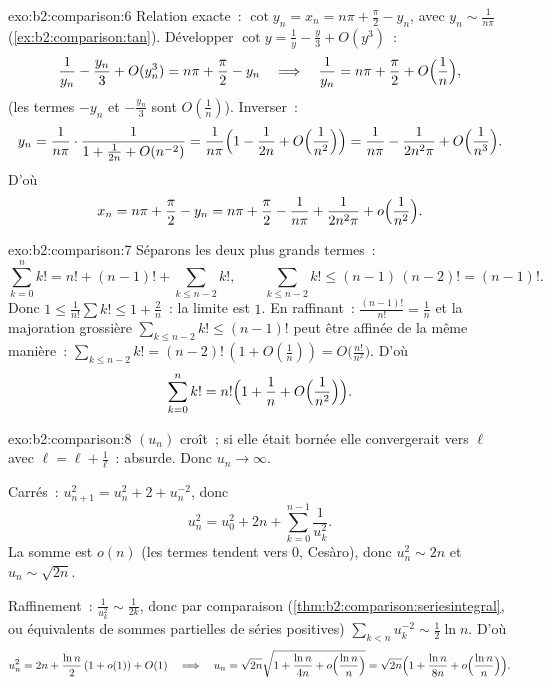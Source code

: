 \begin{solution}{exo:b2:comparison:6}
Relation exacte~: $\cot y_n = x_n = n\pi + \frac\pi2 - y_n$, avec $y_n
\sim \frac{1}{n\pi}$ (\cref{ex:b2:comparison:tan}). Développer $\cot y
= \frac1y - \frac y3 + O(y^3)$~:
\[
\frac{1}{y_n} - \frac{y_n}{3} + O(y_n^3) = n\pi + \frac\pi2 - y_n
\quad\Longrightarrow\quad
\frac{1}{y_n} = n\pi + \frac\pi2 + O\Bigl(\frac1n\Bigr),
\]
(les termes $-y_n$ et $-\frac{y_n}{3}$ sont $O(\frac1n)$). Inverser~:
\[
y_n = \frac{1}{n\pi}\cdot\frac{1}{1 + \frac{1}{2n} + O(n^{-2})}
= \frac{1}{n\pi}\Bigl(1 - \frac{1}{2n} + O\Bigl(\frac{1}{n^2}\Bigr)\Bigr)
= \frac{1}{n\pi} - \frac{1}{2n^2\pi} + O\Bigl(\frac{1}{n^3}\Bigr).
\]
D'où
\[
x_n = n\pi + \frac{\pi}{2} - y_n
= n\pi + \frac\pi2 - \frac{1}{n\pi} + \frac{1}{2n^2\pi} +
o\Bigl(\frac{1}{n^2}\Bigr).
\]
\end{solution}

\begin{solution}{exo:b2:comparison:7}
Séparons les deux plus grands termes~:
\[
\sum_{k=0}^{n} k! = n! + (n-1)! + \sum_{k \leq n-2} k! ,
\qquad
\sum_{k\leq n-2} k! \leq (n-1)\,(n-2)! = (n-1)! .
\]
Donc $1 \leq \frac{1}{n!}\sum k! \leq 1 + \frac{2}{n}$~: la limite est
$1$. En raffinant~: $\frac{(n-1)!}{n!} = \frac1n$ et la majoration
grossière $\sum_{k \leq n-2}k! \leq (n-1)!$ peut être affinée de la
même manière~: $\sum_{k\leq n-2} k! = (n-2)!\,(1 + O(\frac1n)) =
O\bigl(\frac{n!}{n^2}\bigr)$. D'où
\[
\sum_{k=0}^{n} k! = n!\Bigl(1 + \frac1n + O\Bigl(\frac{1}{n^2}\Bigr)\Bigr).
\]
\end{solution}

\begin{solution}{exo:b2:comparison:8}
$(u_n)$ croît~; si elle était bornée elle convergerait vers $\ell$
avec $\ell = \ell + \frac1\ell$~: absurde. Donc $u_n \to \infty$.

Carrés~: $u_{n+1}^2 = u_n^2 + 2 + u_n^{-2}$, donc
\[
u_n^2 = u_0^2 + 2n + \sum_{k=0}^{n-1} \frac{1}{u_k^2} .
\]
La somme est $o(n)$ (les termes tendent vers $0$, Cesàro), donc $u_n^2
\sim 2n$ et $u_n \sim \sqrt{2n}$.

Raffinement~: $\frac{1}{u_k^2} \sim \frac{1}{2k}$, donc par comparaison
(\cref{thm:b2:comparison:seriesintegral}, ou équivalents de sommes
partielles de séries positives) $\sum_{k<n} u_k^{-2} \sim \frac12 \ln
n$. D'où
\[
u_n^2 = 2n + \frac{\ln n}{2}\,(1 + o(1)) + O(1)
\quad\Longrightarrow\quad
u_n = \sqrt{2n}\sqrt{1 + \frac{\ln n}{4n} + o\Bigl(\frac{\ln
n}{n}\Bigr)}
= \sqrt{2n}\Bigl(1 + \frac{\ln n}{8n} + o\Bigl(\frac{\ln
n}{n}\Bigr)\Bigr).
\]
\end{solution}

